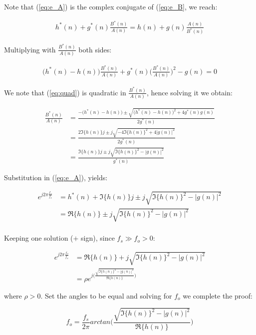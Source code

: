 \documentclass[12pt]{article}
\begin{document}
			Note that (\ref{eq:e_A}) is the complex conjugate of (\ref{eq:e_B}, we reach:
			
			
			\begin{align}
			h^{*}(n) + g^{*}(n) \frac{B^{*}(n)}{A(n)} = h(n) + g(n) \frac{A(n)}{B^{*}(n)}
			\end{align}
			
			Multiplying with $\frac{B^{*}(n)}{A(n)}$ both sides:
			
			\begin{align}
			\bigg( h^{*}(n) - h(n) \bigg) \frac{B^{*}(n)}{A(n)} + g^{*}(n) \bigg( \frac{B^{*}(n)}{A(n)} \bigg)^{2} - g(n) = 0
			\label{eq:quad}
			\end{align}
			
			We note that (\ref{eq:quad}) is quadratic in $\frac{B^{*}(n)}{A(n)}$, hence solving it we obtain:
			
			\begin{align}
			\frac{B^{*}(n)}{A(n)}   &= \frac{- \bigg( h^{*}(n) - h(n) \bigg) \pm \sqrt{\bigg( h^{*}(n) - h(n) \bigg)^{2} + 4 g^{*}(n) g(n)}}{2g^{*}(n)} \\
			&= \frac{2 \Im\{h(n)\}j \pm j\sqrt{-4 \Im\{h(n)\}^{2} + 4 |g(n)|^{2}}}{2g^{*}(n)} \\
			&= \frac{\Im\{h(n)\}j \pm j\sqrt{\Im\{h(n)\}^{2} - |g(n)|^{2}}}{g^{*}(n)}
			\end{align}
			
			Substitution in (\ref{eq:e_A}), yields:
			
			\begin{align}
			e^{j 2\pi \frac{f_{o}}{f_{s}}}  &= h^{*}(n) + \Im\{h(n)\}j \pm j\sqrt{\Im\{h(n)\}^{2} - |g(n)|^{2}} \\
			&= \Re\{h(n)\} \pm j\sqrt{\Im\{h(n)\}^{2} - |g(n)|^{2}} \\
			\end{align}
			
			Keeping one solution ($+$ sign), since $f_{s} \gg f_{o} > 0$:
			
			\begin{align}
			e^{j 2\pi \frac{f_{o}}{f_{s}}}  &= \Re\{h(n)\} + j\sqrt{\Im\{h(n)\}^{2} - |g(n)|^{2}} \\
			&= \rho e^{j\big(\frac{\sqrt{\Im\{h(n)\}^{2} - |g(n)|^{2}}}{\Re\{h(n)\}}\big)}
			\end{align}
			
			where $\rho > 0$. Set the angles to be equal and solving for $f_{o}$ we complete the proof:
			
			\begin{equation}
			f_{o} = \frac{f_{s}}{2 \pi} arctan \bigg(\frac{\sqrt{\Im\{h(n)\}^{2} - |g(n)|^{2}}}{\Re\{h(n)\}}\bigg)
			\label{proof:fo_ACLMS}
			\end{equation}
\end{document}
